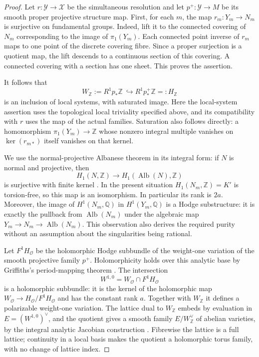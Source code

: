 \begin{proof}
Let $r:\mathcal{Y}\to\mathcal{X}$ be the simultaneous resolution and let $p^+:\mathcal{Y}\to M$ be its smooth proper projective structure map.  First, for each $m$, the map $r_m:Y_m\to N_m$ is surjective on fundamental groups.  Indeed, lift it to the connected covering of $N_m$ corresponding to the image of $\pi_1(Y_m)$.  Each connected point inverse of $r_m$ maps to one point of the discrete covering fibre.  Since a proper surjection is a quotient map, the lift descends to a continuous section of this covering.  A connected covering with a section has one sheet.  This proves the assertion.

It follows that
\begin{equation}
 W_{\mathbb{Z}}:=R^1p_*\mathbb{Z}\ \hookrightarrow
                         R^1p^+_*\mathbb{Z}=:H_{\mathbb{Z}}
 \label{eq:cmp-cohomology-inclusion}
\end{equation}
is an inclusion of local systems, with saturated image.  Here the local-system assertion uses the topological local triviality specified above, and its compatibility with $r$ uses the map of the actual families.  Saturation also follows directly: a homomorphism $\pi_1(Y_m)\to\mathbb{Z}$ whose nonzero integral multiple vanishes on $\ker(r_{m*})$ itself vanishes on that kernel.

We use the normal-projective Albanese theorem in its integral form: if $N$ is normal and projective, then
\[
 H_1(N,\mathbb{Z})\longrightarrow H_1(\operatorname{Alb}(N),\mathbb{Z})
\]
is surjective with finite kernel \cite[Lemma~4.7]{ClaudonHoeringKollar2013}.  In the present situation $H_1(N_m,\mathbb{Z})=K'$ is torsion-free, so this map is an isomorphism. In particular its rank is $2a$.  Moreover, the image of $H^1(N_m,\mathbb{Q})$ in $H^1(Y_m,\mathbb{Q})$ is a Hodge substructure: it is exactly the pullback from $\operatorname{Alb}(N_m)$ under the algebraic map $Y_m\to N_m\to\operatorname{Alb}(N_m)$.  This observation also derives the required purity without an assumption about the singularities being rational.

Let $F^1H_{\mathcal{O}}$ be the holomorphic Hodge subbundle of the weight-one variation of the smooth projective family $p^+$. Holomorphicity holds over this analytic base by Griffiths's period-mapping theorem \cite[II, Theorem~(1.1)]{Griffiths1968}.  The intersection
\[
                    W^{1,0}=W_{\mathcal{O}}\cap F^1H_{\mathcal{O}}
\]
is a holomorphic subbundle: it is the kernel of the holomorphic map $W_{\mathcal{O}}\to H_{\mathcal{O}}/F^1H_{\mathcal{O}}$ and has the constant rank $a$.  Together with $W_{\mathbb{Z}}$ it defines a polarizable weight-one variation.  The lattice dual to $W_{\mathbb{Z}}$ embeds by evaluation in $E=(W^{1,0})^\vee$, and the quotient gives a smooth family $E/W_{\mathbb{Z}}^\vee$ of abelian varieties, by the integral analytic Jacobian construction \cite[\S2.1]{Claudon2018}. Fibrewise the lattice is a full lattice; continuity in a local basis makes the quotient a holomorphic torus family, with no change of lattice index.


\end{proof}
